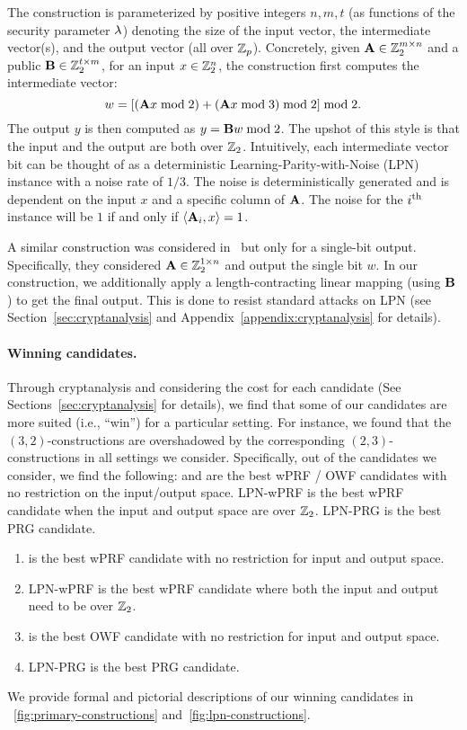 \begin{itemize}
    \hspace*{1em} The construction is parameterized by positive integers $n,m,t$ (as functions of the security parameter $\lambda$) denoting the size of the input vector, the intermediate vector(s), and the output vector (all over $\mathbb{Z}_p$).
    Concretely, given $\mat{A} \in \Z_2^{m \times n}$ and a public $\mat{B} \in \Z_2^{t \times m}$, for an input $x \in \mathbb{Z}_2^n$, the construction first computes the intermediate vector:
    \[
        w = \left[(\mat{A}x \bmod 2) + (\mat{A}x \bmod 3) \bmod 2\right] \bmod 2.
    \]
    The output $y$ is then computed as $y = \mat{B}w \bmod 2$. The upshot of this style is that the input and the output are both over $\mathbb{Z}_2$. Intuitively, each intermediate vector bit can be thought of as a deterministic Learning-Parity-with-Noise (LPN) instance with a noise rate of $1/3$. The noise is deterministically generated and is dependent on the input $x$ and a specific column of $\mat{A}$. The noise for the $i^{\textnormal{th}}$ instance will be $1$ if and only if $\left<\mat{A}_i, x\right> = 1$.

    \hspace*{1em} A similar construction was considered in~\cite{boneh2018-darkmatter} but only for a single-bit output. Specifically, they considered $\mat{A} \in \Z_2^{1 \times n}$ and output the single bit $w$. In our construction, we additionally apply a length-contracting linear mapping (using $\mat{B}$) to get the final output. This is done to resist standard attacks on LPN (see Section~\ref{sec:cryptanalysis} and Appendix~\ref{appendix:cryptanalysis} for details).
\end{itemize}


\paragraph{Winning candidates.}
Through cryptanalysis and considering the cost for each candidate (See Sections~\ref{sec:cryptanalysis} for details), we find that some of our candidates are more suited (i.e., ``win'') for a particular setting. For instance, we found that the $(3,2)$-constructions are overshadowed by the corresponding $(2,3)$-constructions in all settings we consider. Specifically, out of the candidates we consider, we find the following: \ttwPRF and \ttOWF are the best wPRF / OWF candidates with no restriction on the input/output space. LPN-wPRF is the best wPRF candidate when the input and output space are over $\mathbb{Z}_2$. LPN-PRG is the best PRG candidate.
\iffull
\begin{enumerate}
    \item \ttwPRF is the best wPRF candidate with no restriction for input and output space. 
    \item LPN-wPRF is the best wPRF candidate where both the input and output need to be over $\mathbb{Z}_2$.
    \item \ttOWF is the best OWF candidate with no restriction for input and output space.
    \item LPN-PRG is the best PRG candidate.
\end{enumerate}
\fi
We provide formal and pictorial descriptions of our winning candidates in \fig~\ref{fig:primary-constructions} and~\ref{fig:lpn-constructions}.

